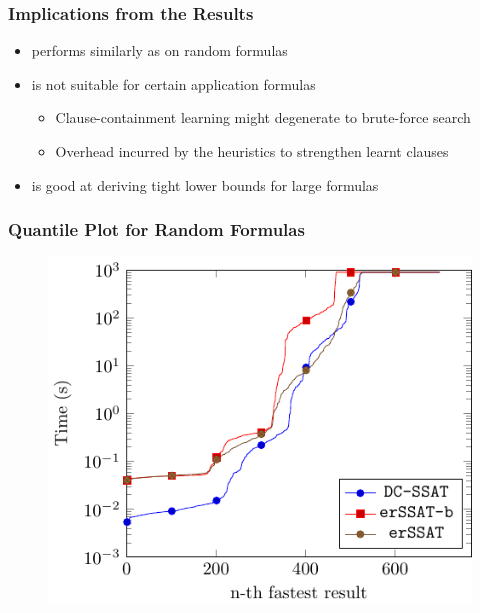 \begin{frame}
    \frametitle{Implications from the Results}
    \begin{itemize}
        \item \erssat performs similarly as \dcssat on random formulas
              \pause
        \item \erssat is not suitable for certain application formulas
              \begin{itemize}
                  \item Clause-containment learning might degenerate to brute-force search
                  \item Overhead incurred by the heuristics to strengthen learnt clauses
              \end{itemize}
              \pause
        \item \erssat is good at deriving tight lower bounds for large formulas
    \end{itemize}
\end{frame}

\begin{frame}
    \frametitle{Quantile Plot for Random Formulas}
    \begin{figure}
        \centering
        \includegraphics{fig/exist-random-ssat/quantile-cputime-Random.pdf}
    \end{figure}
\end{frame}

